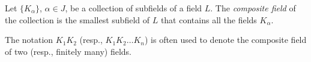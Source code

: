 \documentclass{article}
\begin{document}
Let $\{K_\alpha\}$, $\alpha \in J$, be a collection of subfields of a field $L$. The {\em composite field} of the collection is the smallest subfield of $L$ that contains all the fields $K_\alpha$.

The notation $K_1 K_2$ (resp., $K_1 K_2 \dots K_n$) is often used to denote the composite field of two (resp., finitely many) fields.
\end{document}
